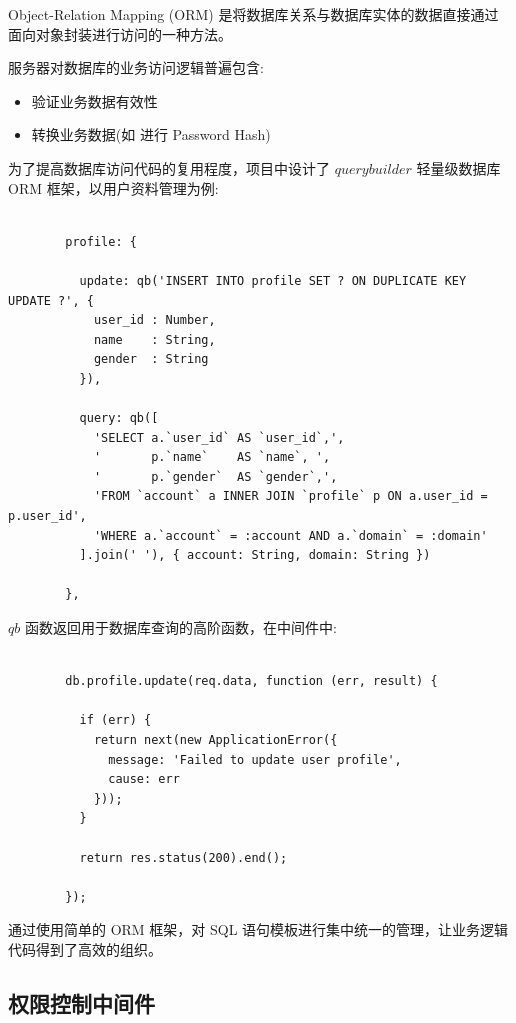 Object-Relation Mapping (ORM) 是将数据库关系与数据库实体的数据直接通过面向对象封装进行访问的一种方法。

服务器对数据库的业务访问逻辑普遍包含:

\begin{itemize}
  \item 验证业务数据有效性
  \item 转换业务数据(如 进行 Password Hash)
\end{itemize}

为了提高数据库访问代码的复用程度，项目中设计了 $querybuilder$ 轻量级数据库 ORM 框架，以用户资料管理为例:

\begin{verbatim}

        profile: {

          update: qb('INSERT INTO profile SET ? ON DUPLICATE KEY UPDATE ?', {
            user_id : Number,
            name    : String,
            gender  : String
          }),

          query: qb([
            'SELECT a.`user_id` AS `user_id`,',
            '       p.`name`    AS `name`, ',
            '       p.`gender`  AS `gender`,',
            'FROM `account` a INNER JOIN `profile` p ON a.user_id = p.user_id',
            'WHERE a.`account` = :account AND a.`domain` = :domain'
          ].join(' '), { account: String, domain: String })

        },

\end{verbatim}

$qb$ 函数返回用于数据库查询的高阶函数，在中间件中:

\begin{verbatim}

        db.profile.update(req.data, function (err, result) {

          if (err) {
            return next(new ApplicationError({
              message: 'Failed to update user profile',
              cause: err
            }));
          }

          return res.status(200).end();

        });

\end{verbatim}

通过使用简单的 ORM 框架，对 SQL 语句模板进行集中统一的管理，让业务逻辑代码得到了高效的组织。

\subsection{权限控制中间件}

